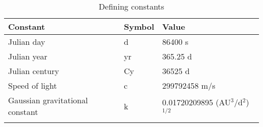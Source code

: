 \documentclass[Orbiter User Manual.tex]{subfiles}
\begin{document}
	\begin{longtable}{ |p{}|p{}|p{}| }
	\hline\rule{0pt}{2ex}
	\textbf{Constant} & \textbf{Symbol} & \textbf{Value}\\
	\hline\rule{0pt}{2ex}
	Julian day & d & 86400 s\\
	\hline\rule{0pt}{2ex}
	Julian year & yr & 365.25 d\\
	\hline\rule{0pt}{2ex}
	Julian century & Cy & 36525 d\\
	\hline\rule{0pt}{2ex}
	Speed of light & c & 299792458 m/s\\
	\hline\rule{0pt}{2ex}
	Gaussian gravitational constant & k & 0.01720209895 (AU$^{3}$/d$^{2}$)$^{1/2}$\\
	\hline
	\caption{Defining constants}
	\end{longtable}
\end{document}
